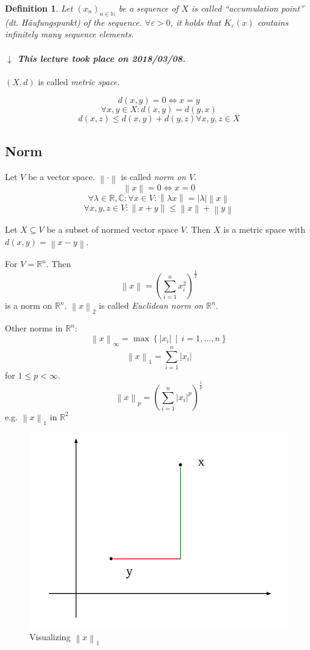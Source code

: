 \documentclass{article}
\newtheorem{definition}{Definition}  \numberwithin{definition}{section}
\newcommand{\setdef}[2]{\left\{\left.#1\,\middle|\,#2\right.\right\}}
\newcommand{\norm}[1]{\left\|#1\right\|}
\newcommand{\card}[1]{\left|#1\right|}
\newcommand{\dateref}[1]{%
  \begin{mdframed}[backgroundcolor=gray!10,innerbottommargin=0pt,innertopmargin=0pt]
    \paragraph{\textit{$\downarrow$ This lecture took place on #1.}}%
  \end{mdframed}%
}
\begin{document}
\begin{definition}
  Let $(x_n)_{n\in\mathbb N}$ be a sequence of $X$ is called \enquote{accumulation point} (\foreignlanguage{german}{dt. H\"aufungspunkt}) of the sequence.
  $\forall \varepsilon > 0$, it holds that $K_{\varepsilon}(x)$ contains infinitely many sequence elements.
\end{definition}

\dateref{2018/03/08}

$(X, d)$ is called \emph{metric space}.

\[ d(x,y) =0 \iff x = y \]
\[ \forall x,y \in X: d(x,y) = d(y,x) \]
\[ d(x,z) \leq d(x,y) + d(y,z) \forall x,y,z \in X \]

\subsection{Norm}

Let $V$ be a vector space. $\norm{\cdot}$ is called \emph{norm on $V$}.
\[ \norm{x} = 0 \iff x = 0 \]
\[ \forall \lambda \in \mathbb R, \mathbb C: \forall x \in V: \norm{\lambda x} = \card{\lambda} \norm{x} \]
\[ \forall x,y,z \in V: \norm{x + y} \leq \norm{x} + \norm{y} \]

Let $X \subseteq V$ be a subset of normed vector space $V$.
Then $X$ is a metric space with $d(x,y) = \norm{x - y}$.

For $V = \mathbb R^n$. Then
\[ \norm{x} = \left(\sum_{i=1}^n x_i^2\right)^{\frac12} \]
is a norm on $\mathbb R^n$. $\norm{x}_2$ is called \emph{Euclidean norm on $\mathbb R^n$}.

Other norms in $\mathbb R^n$:
\[ \norm{x}_{\infty} = \max\setdef{\card{x_i}}{i = 1,\dots,n} \]
\[ \norm{x}_1 = \sum_{i=1}^n \card{x_i} \]
for $1 \leq p < \infty$.
\[ \norm{x}_p = \left(\sum_{i=1}^n \card{x_i}^p\right)^{\frac1p} \]
e.g. $\norm{x}_1$ in $\mathbb R^2$

\begin{figure}[!ht]
  \begin{center}
    \includegraphics{img/02_1norm.pdf}
    \caption{Visualizing $\norm{x}_1$}
    \label{img:1norm}
  \end{center}
\end{figure}
\end{document}
